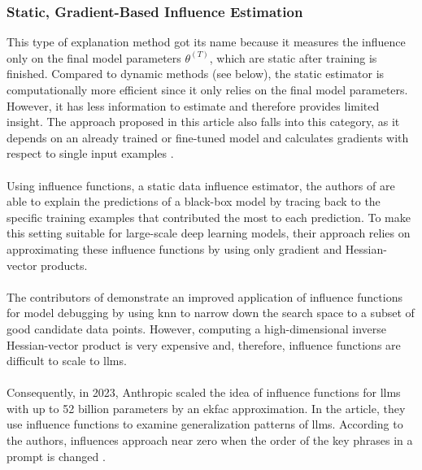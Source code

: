 \subsubsection{Static, Gradient-Based Influence Estimation}
This type of explanation method got its name because it measures the influence only on the final model parameters $\theta^{(T)}$, which are static after training is finished. Compared to dynamic methods (see  below), the static estimator is computationally more efficient since it only relies on the final model parameters. However, it has less information to estimate and therefore provides limited insight. The approach proposed in this article also falls into this category, as it depends on an already trained or fine-tuned model and calculates gradients with respect to single input examples \cite{Hammoudeh_2024}.
\\\\
Using influence functions, a static data influence estimator, the authors of \cite{koh2020understandingblackboxpredictionsinfluence} are able to explain the predictions of a black-box model by tracing back to the specific training examples that contributed the most to each prediction. To make this setting suitable for large-scale deep learning models, their approach relies on approximating these influence functions by using only gradient and Hessian-vector products. 
\\\\
The contributors of \cite{guo2021fastifscalableinfluencefunctions} demonstrate an improved application of influence functions for model debugging by using \acrfull{knn} to narrow down the search space to a subset of good candidate data points. However, computing a high-dimensional inverse Hessian-vector product is very expensive and, therefore, influence functions are difficult to scale to \acrlong{llm}s. 
\\\\
Consequently, in 2023, Anthropic scaled the idea of influence functions for \acrshort{llm}s with up to 52 billion parameters by an \acrfull{ekfac} approximation. In the article, they use influence functions to examine generalization patterns of \acrlong{llm}s. According to the authors, influences approach near zero when the order of the key phrases in a prompt is changed \cite{grosse2023studyinglargelanguagemodel}. 

